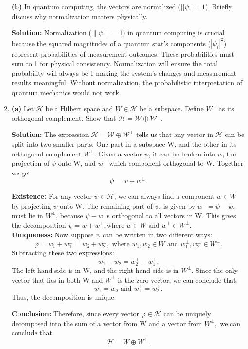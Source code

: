 \documentclass{article}
\renewcommand{\phi}{\varphi}
\theoremstyle{plain}
\numberwithin{thm}{section}
\theoremstyle{definition}
\begin{document}
\begin{enumerate}
    \textbf{(b)} In quantum computing, the vectors are normalized $(||\psi||=1$). Briefly discuss why normalization matters physically.

    \textbf{Solution:} 
    Normalization ($\|\psi \|=1$) in quantum computing is crucial because the squared magnitudes of a quantum stat's components ($|\psi_i|^2$) represent probabilities of measurement outcomes. These probabilities must sum to 1 for physical consistency. Normalization will ensure the total probability will always be 1 making the system's changes and measurement results meaningful. Without normalization, the probabilistic interpretation of quantum mechanics would not work.
    
    \item \textbf{(a)} Let $\mathcal{H}$ be a Hilbert space and $W \in \mathcal{H}$ be a subspace. Define $W^\perp$ as its orthogonal complement. Show that $\mathcal{H= W \oplus W^\perp}$.

    \textbf{Solution:} 
    The expression $\mathcal{H= W \oplus W^\perp}$ tells us that any vector in $\mathcal{H}$ can be split into two smaller parts. One part in a subspace W, and the other in its orthogonal complement $W^\perp$. Given a vector $\psi$, it can be broken into $w$, the projection of $\psi$ onto W, and $w^\perp$ which component orthogonal to W. Together we get $$\psi=w+w^\perp.$$ 
    
    \textbf{Existence:} For any vector $\psi \in \mathcal{H}$, we can always find a component $w \in W$ by projecting $\psi$ onto W. The remaining part of $\psi$, is given by $w^\perp=\psi-w$, must lie in $W^\perp$, because $\psi-w$ is orthogonal to all vectors in W. This gives the decomposition $\psi=w+w^\perp, \text{where } w \in W \text{ and } w^\perp \in W^\perp.$\\

    \textbf{Uniqueness:} Now suppose $\psi$ can be written in two different ways: $$\phi=w_1+w_1^\perp=w_2+w_2^\perp, \text{ where } w_1,w_2 \in W \text{ and } w_1^\perp,w_2^\perp \in W^\perp.$$ Subtracting these two expressions: $$w_1-w_2=w_2^\perp-w_1^\perp.$$ The left hand side is in W, and the right hand side is in $W^\perp.$ Since the only vector that lies in both W and $W^\perp$ is the zero vector, we can conclude that: $$w_1=w_2 \text{ and }w_1^\perp=w_2^\perp.$$ Thus, the decomposition is unique.

    \textbf{Conclusion:} Therefore, since every vector $\phi \in \mathcal{H}$ can be uniquely decomposed into the sum of a vector from W and a vector from $W^\perp,$ we can conclude that: $$\mathcal{H}=W \oplus W^\perp.$$


\end{enumerate}
\end{document}
